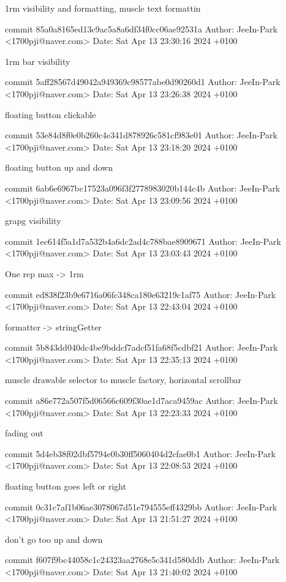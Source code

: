     1rm visibility and formatting, muscle text formattin

commit 85a0a8165ed13c9ac5a8a6df34f0cc06ae92531a
Author: JeeIn-Park <1700pji@naver.com>
Date:   Sat Apr 13 23:30:16 2024 +0100

    1rm bar visibility

commit 5aff28567d49042a949369c98577abe0d90260d1
Author: JeeIn-Park <1700pji@naver.com>
Date:   Sat Apr 13 23:26:38 2024 +0100

    floating button clickable

commit 53e84d8f0e0b260c4e341d878926c581cf983e01
Author: JeeIn-Park <1700pji@naver.com>
Date:   Sat Apr 13 23:18:20 2024 +0100

    floating button up and down

commit 6ab6e6967bc17523a096f3f2778983020b144c4b
Author: JeeIn-Park <1700pji@naver.com>
Date:   Sat Apr 13 23:09:56 2024 +0100

    grapg visibility

commit 1ec614f5a1d7a532b4a6dc2ad4c788bae8909671
Author: JeeIn-Park <1700pji@naver.com>
Date:   Sat Apr 13 23:03:43 2024 +0100

    One rep max -> 1rm

commit ed838f23b9e6716a06fc348ca180e63219c1af75
Author: JeeIn-Park <1700pji@naver.com>
Date:   Sat Apr 13 22:43:04 2024 +0100

    formatter -> stringGetter

commit 5b843dd040dc4be9bddcf7adcf51fa68f5cdbf21
Author: JeeIn-Park <1700pji@naver.com>
Date:   Sat Apr 13 22:35:13 2024 +0100

    muscle drawable selector to muscle factory, horizontal scrollbar

commit a86e772a507f5d06566c609f30ae1d7aca9459ac
Author: JeeIn-Park <1700pji@naver.com>
Date:   Sat Apr 13 22:23:33 2024 +0100

    fading out

commit 5d4eb38f02dbf5794e0b30ff5060404d2cfae0b1
Author: JeeIn-Park <1700pji@naver.com>
Date:   Sat Apr 13 22:08:53 2024 +0100

    floating button goes left or right

commit 0c31c7af1b06ae3078067d51e794555eff4329bb
Author: JeeIn-Park <1700pji@naver.com>
Date:   Sat Apr 13 21:51:27 2024 +0100

    don't go too up and down

commit f607f9bc44058c1c24323aa2768e5c341d580ddb
Author: JeeIn-Park <1700pji@naver.com>
Date:   Sat Apr 13 21:40:02 2024 +0100

